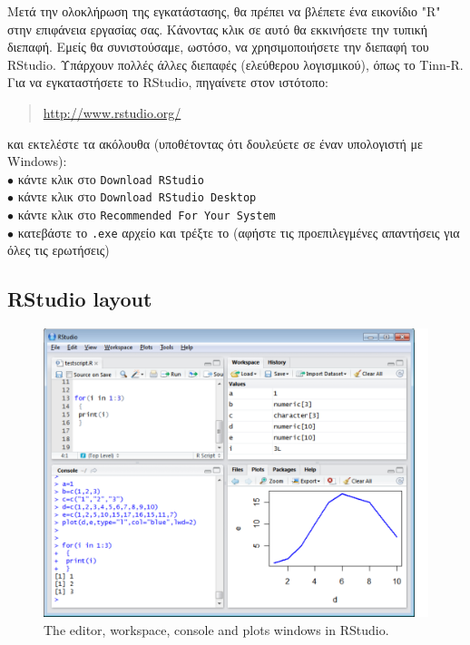 \documentclass[a4paper,11pt,twocolumn,tablecaptionabove]{scrartcl}
\makeatletter
\let\SF@@footnote\footnote
\def\footnote{\ifx\protect\@typeset@protect
 \expandafter\SF@@footnote
 \else
 \expandafter\SF@gobble@opt
 \fi
}
\edef\SF@gobble@opt{\noexpand\protect
 \expandafter\noexpand\csname SF@gobble@opt \endcsname}
\makeatother
\begin{document}
Μετά την ολοκλήρωση της εγκατάστασης, θα πρέπει να βλέπετε ένα εικονίδιο "R" στην επιφάνεια
εργασίας σας. Κάνοντας κλικ σε αυτό θα εκκινήσετε την τυπική διεπαφή. Εμείς θα συνιστούσαμε,
ωστόσο, να χρησιμοποιήσετε την διεπαφή του RStudio. \footnote{Υπάρχουν πολλές άλλες διεπαφές
(ελεύθερου λογισμικού), όπως το Tinn-R.} Για να εγκαταστήσετε το RStudio, πηγαίνετε στον ιστότοπο: 
\begin{quote}
  \url{http://www.rstudio.org/}
\end{quote}
και εκτελέστε τα ακόλουθα (υποθέτοντας ότι δουλεύετε σε έναν υπολογιστή με Windows):\\
\noindent $\bullet$ κάντε κλικ στο \texttt{Download RStudio}\\
\noindent $\bullet$ κάντε κλικ στο \texttt{Download RStudio Desktop}\\
\noindent $\bullet$ κάντε κλικ στο \texttt{Recommended For Your System}\\
\noindent $\bullet$ κατεβάστε το \texttt{.exe} αρχείο και τρέξτε το 
(αφήστε τις προεπιλεγμένες απαντήσεις για όλες τις ερωτήσεις)

\subsection{RStudio layout}

\begin{figure}[htb]
  \centering
  \includegraphics[width=13cm, clip=true, trim=0cm 0cm 9mm 0cm]{img/rstudio_screenshot.pdf}
  \caption{The editor, workspace, console and plots windows in RStudio.}
  \label{fig:screenshot}
\end{figure}
\end{document}

